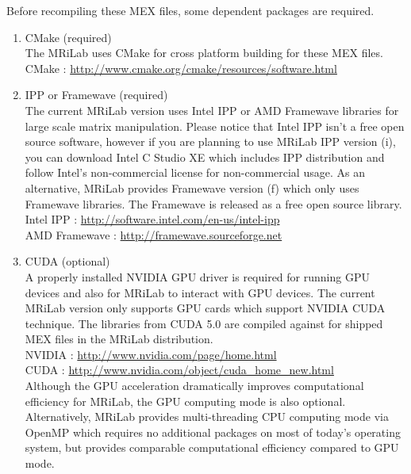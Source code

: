 \documentclass{book}%
\begin{document}
Before recompiling these MEX files, some dependent packages are required.
\begin{enumerate}

\item CMake (required)\\
The MRiLab uses CMake for cross platform building for these MEX files.\\

CMake : \url{http://www.cmake.org/cmake/resources/software.html} \\

\item IPP or Framewave (required)\\
The current MRiLab version uses Intel IPP or AMD Framewave libraries for large scale matrix manipulation. Please notice that Intel IPP isn't a free open source software, however if you are planning to use MRiLab IPP version (i), you can download Intel C Studio XE which includes IPP distribution and follow Intel's non-commercial license for non-commercial usage. As an alternative, MRiLab provides Framewave version (f) which only uses Framewave libraries. The Framewave is released as a free open source library.\\

Intel IPP : \url{http://software.intel.com/en-us/intel-ipp} \\
AMD Framewave : \url{http://framewave.sourceforge.net} \\

\item CUDA (optional)\\
A properly installed NVIDIA GPU driver is required for running GPU devices and also for MRiLab to interact with GPU devices. The current MRiLab version only supports GPU cards which support NVIDIA CUDA technique. The libraries from CUDA 5.0 are compiled against for shipped MEX files in the MRiLab distribution. \\

NVIDIA : \url{http://www.nvidia.com/page/home.html} \\
CUDA : \url{http://www.nvidia.com/object/cuda_home_new.html} \\

Although the GPU acceleration dramatically improves computational efficiency for MRiLab, the GPU computing mode is also optional. Alternatively, MRiLab provides multi-threading CPU computing mode via OpenMP which requires no additional packages on most of today's operating system, but provides comparable computational efficiency compared to GPU mode.


\end{enumerate}
\end{document}
